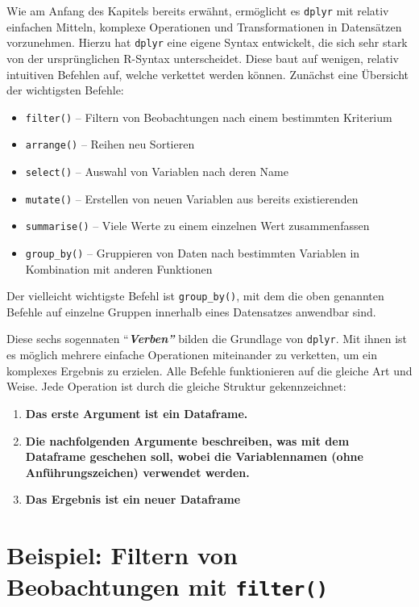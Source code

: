 \documentclass[
  ngerman,
]{book}
\begin{document}
Wie am Anfang des Kapitels bereits erwähnt, ermöglicht es \texttt{dplyr} mit relativ einfachen Mitteln, komplexe Operationen und Transformationen in Datensätzen vorzunehmen. Hierzu hat \texttt{dplyr} eine eigene Syntax entwickelt, die sich sehr stark von der ursprünglichen R-Syntax unterscheidet. Diese baut auf wenigen, relativ intuitiven Befehlen auf, welche verkettet werden können. Zunächst eine Übersicht der wichtigsten Befehle:

\begin{itemize}
\item
  \texttt{filter()} -- Filtern von Beobachtungen nach einem bestimmten Kriterium
\item
  \texttt{arrange()} -- Reihen neu Sortieren
\item
  \texttt{select()} -- Auswahl von Variablen nach deren Name
\item
  \texttt{mutate()} -- Erstellen von neuen Variablen aus bereits existierenden
\item
  \texttt{summarise()} -- Viele Werte zu einem einzelnen Wert zusammenfassen
\item
  \texttt{group\_by()} -- Gruppieren von Daten nach bestimmten Variablen in Kombination mit anderen Funktionen
\end{itemize}

Der vielleicht wichtigste Befehl ist \texttt{group\_by()}, mit dem die oben genannten Befehle auf einzelne Gruppen innerhalb eines Datensatzes anwendbar sind.

Diese sechs sogennaten ``\textbf{\emph{Verben''}} bilden die Grundlage von \texttt{dplyr}. Mit ihnen ist es möglich mehrere einfache Operationen miteinander zu verketten, um ein komplexes Ergebnis zu erzielen. Alle Befehle funktionieren auf die gleiche Art und Weise. Jede Operation ist durch die gleiche Struktur gekennzeichnet:

\begin{enumerate}
\def\labelenumi{\arabic{enumi}.}
\item
  \textbf{Das erste Argument ist ein Dataframe.}
\item
  \textbf{Die nachfolgenden Argumente beschreiben, was mit dem Dataframe geschehen soll, wobei die Variablennamen (ohne Anführungszeichen) verwendet werden.}
\item
  \textbf{Das Ergebnis ist ein neuer Dataframe}
\end{enumerate}

\section{\texorpdfstring{Beispiel: Filtern von Beobachtungen mit \texttt{filter()}}{Beispiel: Filtern von Beobachtungen mit filter()}}\label{beispiel-filtern-von-beobachtungen-mit-filter}
\end{document}

